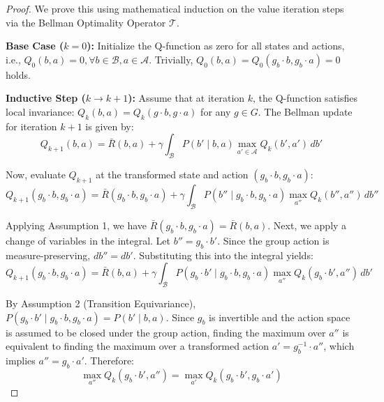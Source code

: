 \documentclass[12pt]{article}
\begin{document}
\begin{proof}
We prove this using mathematical induction on the value iteration steps via the Bellman Optimality Operator $\mathcal{T}$.

\textbf{Base Case ($k=0$):} Initialize the Q-function as zero for all states and actions, i.e., $Q_0(b, a) = 0, \forall b \in \mathcal{B}, a \in \mathcal{A}$. Trivially, $Q_0(b, a) = Q_0(g_b \cdot b, g_b \cdot a) = 0$ holds.

\textbf{Inductive Step ($k \rightarrow k+1$):} Assume that at iteration $k$, the Q-function satisfies local invariance: $Q_k(b, a) = Q_k(g \cdot b, g \cdot a)$ for any $g \in G$. The Bellman update for iteration $k+1$ is given by:
\begin{equation}
    Q_{k+1}(b, a) = \bar{R}(b, a) + \gamma \int_{\mathcal{B}} P(b' \mid b, a) \max_{a' \in \mathcal{A}} Q_k(b', a') \, db' \label{eq:bellman_k}
\end{equation}

Now, evaluate $Q_{k+1}$ at the transformed state and action $(g_b \cdot b, g_b \cdot a)$:
\begin{equation*}
    Q_{k+1}(g_b \cdot b, g_b \cdot a) = \bar{R}(g_b \cdot b, g_b \cdot a) + \gamma \int_{\mathcal{B}} P(b'' \mid g_b \cdot b, g_b \cdot a) \max_{a''} Q_k(b'', a'') \, db''
\end{equation*}

Applying Assumption 1, we have $\bar{R}(g_b \cdot b, g_b \cdot a) = \bar{R}(b, a)$. Next, we apply a change of variables in the integral. Let $b'' = g_b \cdot b'$. Since the group action is measure-preserving, $db'' = db'$. Substituting this into the integral yields:
\begin{equation*}
    Q_{k+1}(g_b \cdot b, g_b \cdot a) = \bar{R}(b, a) + \gamma \int_{\mathcal{B}} P(g_b \cdot b' \mid g_b \cdot b, g_b \cdot a) \max_{a''} Q_k(g_b \cdot b', a'') \, db'
\end{equation*}

By Assumption 2 (Transition Equivariance), $P(g_b \cdot b' \mid g_b \cdot b, g_b \cdot a) = P(b' \mid b, a)$. Since $g_b$ is invertible and the action space is assumed to be closed under the group action, finding the maximum over $a''$ is equivalent to finding the maximum over a transformed action $a' = g_b^{-1} \cdot a''$, which implies $a'' = g_b \cdot a'$. Therefore:
\begin{equation*}
    \max_{a''} Q_k(g_b \cdot b', a'') = \max_{a'} Q_k(g_b \cdot b', g_b \cdot a')
\end{equation*}


\end{proof}
\end{document}

